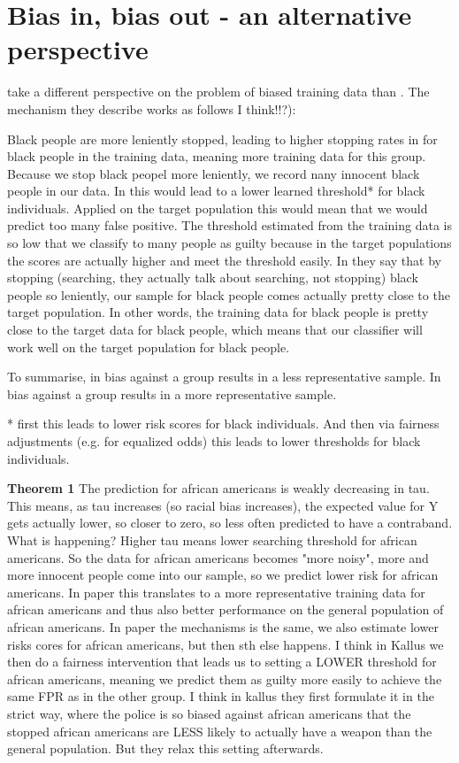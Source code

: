 \section*{Bias in, bias out - an alternative perspective}

\cite{RambachanBBOEFW} take a different perspective on the problem of biased training data than \cite{kallus}.
The mechanism they describe works as follows I think!!?): 

Black people are more leniently stopped, leading to higher stopping rates in for black people in the training data, meaning
more training data for this group. Because we stop black peopel more leniently, we record nany innocent black people in our data.
In \cite{kallus} this would lead to a lower learned threshold* for black individuals. Applied
on the target population this would mean that we would predict too many false positive. The threshold estimated from the training 
data is so low that we classify to many people as guilty because in the target populations the scores are actually higher and meet the threshold easily.
In \cite{RambachanBBOEFW} they say that by stopping (searching, they actually talk about searching, not stopping) black people so leniently, our sample for black people comes actually pretty
close to the target population.
In other words, the training data for black people is pretty close to the target data for black people, which means that our classifier will work well on the
target population for black people.

To summarise, in \cite{kallus} bias against a group results in a less representative sample. In \cite{RambachanBBOEFW} bias against a group results in a more representative sample.

* first this leads to lower risk scores for black individuals. And then via fairness adjustments (e.g. for equalized odds) this leads to lower thresholds for black individuals.


\textbf{Theorem 1}
The prediction for african americans is weakly decreasing in tau. This means, as tau increases (so racial bias increases), the expected value for Y gets actually lower,
so closer to zero, so less often predicted to have a contraband. What is happening? Higher tau means lower searching threshold for african americans.
So the data for african americans becomes "more noisy", more and more innocent people come into our sample, so we predict lower risk for african americans. 
In \cite{RambachanBBOEFW} paper this translates to a more representative training data for african americans and thus also better performance on the general population of african americans.
In \cite{kallus} paper the mechanisms is the same, we also estimate lower risks cores for african americans, but then sth else happens.
I think in Kallus we then do a fairness intervention that leads us to setting a LOWER threshold for african americans, meaning we predict them as
guilty more easily to achieve the same FPR as in the other group. I think in kallus they first formulate it in the strict way, where the police is so biased against african americans
that the stopped african americans are LESS likely to actually have a weapon than the general population. But they relax this setting afterwards.



